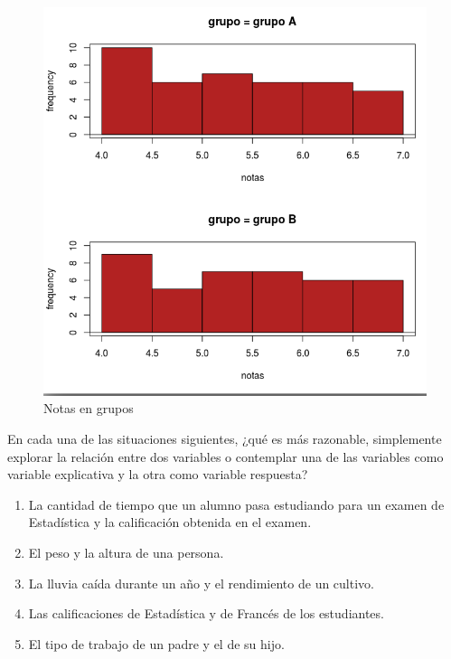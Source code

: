 \documentclass[11pt,evaluacion]{uescimat}
\begin{document}
\begin{problema}
\begin{figure}[H]
\begin{centering}
\includegraphics[scale=0.30]{imagen8.png}
\par\end{centering}
\caption{Notas en grupos}
\end{figure}


\end{problema}


\begin{problema}
En cada una de las situaciones siguientes, ¿qué es más razonable, simplemente explorar la relación entre dos variables o contemplar una de las variables como
variable explicativa y la otra como variable respuesta?

\begin{enumerate}[label=(\alph*)]
\item La cantidad de tiempo que un alumno pasa estudiando para un examen
de Estadística y la calificación obtenida en el examen.
\item El peso y la altura de una persona.
\item La lluvia caída durante un año y el rendimiento de un cultivo.
\item Las calificaciones de Estadística y de Francés de los estudiantes.
\item El tipo de trabajo de un padre y el de su hijo.
\end{enumerate}



\end{problema}
\end{document}

